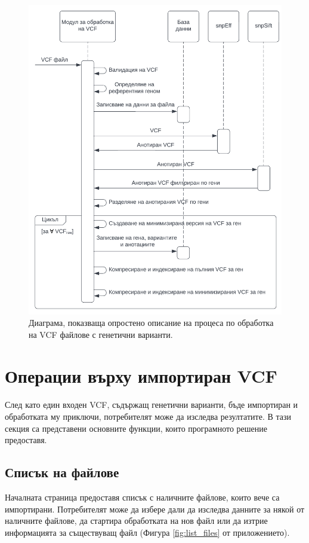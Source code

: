 \documentclass[pdftex,cyrillic,14pt,a4page,twoside,openright]{extreport}
\begin{document}
\begin{figure}[htp]
  \centering
  \includegraphics[width=16cm]{figures/vcf_processing_sequence}
  \caption {Диаграма, показваща опростено описание на процеса по обработка на VCF файлове с генетични варианти.}
  \label{fig:vcf_processing_sequence}
\end{figure}

\section{Операции върху импортиран VCF}
\paragraph{}
След като един входен VCF, съдържащ генетични варианти, бъде импортиран и обработката му приключи, потребителят може да изследва резултатите. В тази секция са представени основните функции, които програмното решение предоставя.

\subsection{Списък на файлове}
Началната страница предоставя списък с наличните файлове, които вече са импортирани. Потребителят може да избере дали да изследва данните за някой от наличните файлове, да стартира обработката на нов файл или да изтрие информацията за съществуващ файл (Фигура \ref{fig:list_files} от приложението).
\end{document}
